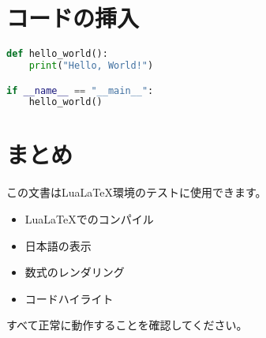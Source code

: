 \documentclass[12pt,a4paper]{article}
\begin{document}
\section{コードの挿入}

\begin{lstlisting}[language=Python, caption=Pythonコード例]
def hello_world():
    print("Hello, World!")

if __name__ == "__main__":
    hello_world()
\end{lstlisting}

\section{まとめ}

この文書はLuaLaTeX環境のテストに使用できます。
\begin{itemize}
  \item LuaLaTeXでのコンパイル
  \item 日本語の表示
  \item 数式のレンダリング
  \item コードハイライト
\end{itemize}

すべて正常に動作することを確認してください。
\end{document}
